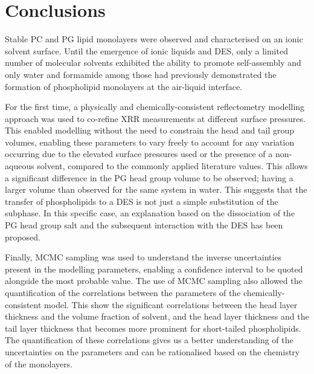 \section{Conclusions}
Stable PC and PG lipid monolayers were observed and characterised on an ionic solvent surface.
Until the emergence of ionic liquids and DES, only a limited number of molecular solvents exhibited the ability to promote self-assembly and only water and formamide among those had previously demonstrated the formation of phospholipid monolayers at the air-liquid interface.\autocite{mohwald_phospholipid_1990,graner_phospholipidic_1995}

For the first time, a physically and chemically-consistent reflectometry modelling approach was used to co-refine XRR measurements at different surface pressures.
This enabled modelling without the need to constrain the head and tail group volumes, enabling these parameters to vary freely to account for any variation occurring due to the elevated surface pressures used or the presence of a non-aqueous solvent, compared to the commonly applied literature values.
This allows a significant difference in the PG head group volume to be observed; having a larger volume than observed for the same system in water.
This suggests that the transfer of phospholipids to a DES is not just a simple substitution of the subphase.
In this specific case, an explanation based on the dissociation of the PG head group salt and the subsequent interaction with the DES has been proposed.

Finally, MCMC sampling was used to understand the inverse uncertainties present in the modelling parameters, enabling a confidence interval to be quoted alongside the most probable value.
The use of MCMC sampling also allowed the quantification of the correlations between the parameters of the chemically-consistent model.
This show the significant correlations between the head layer thickness and the volume fraction of solvent, and the head layer thickness and the tail layer thickness that becomes more prominent for short-tailed phospholipids.
The quantification of these correlations gives us a better understanding of the uncertainties on the parameters and can be rationalised based on the chemistry of the monolayers.
